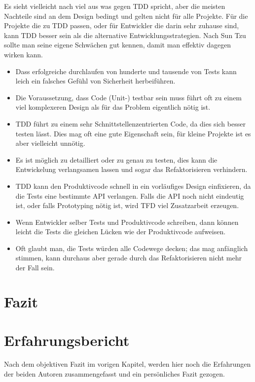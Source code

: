 \documentclass{mitschrift}
\newcommand{\pje}{\marginpar{Philipp\\Jeske}}
\begin{document}
Es sieht vielleicht nach viel aus was gegen TDD spricht, aber die meisten
Nachteile sind an dem Design bedingt und gelten nicht für alle Projekte. Für
die Projekte die zu TDD passen, oder für Entwickler die darin sehr zuhause
sind, kann TDD besser sein als die alternative Entwicklungsstrategien.
Nach Sun Tzu sollte man seine eigene Schwächen gut kennen, damit man effektiv
dagegen wirken kann.

\begin{itemize}
    \item Dass erfolgreiche durchlaufen von hunderte und tausende von Tests
        kann leich ein falsches Gefühl von Sicherheit herbeiführen.
        \cite{StackExchange}
    \item Die Voraussetzung, dass Code (Unit-) testbar sein muss führt oft zu
        einem viel komplexeren Design als für das Problem eigentlich nötig ist.
        \cite{StackExchange}
    \item TDD führt zu einem sehr Schnittstellenzentrierten Code, da dies sich
        besser testen lässt. Dies mag oft eine gute Eigenschaft sein, für
        kleine Projekte ist es aber vielleicht unnötig.
    \item Es ist möglich zu detailliert oder zu genau zu testen, dies kann die
        Entwickelung verlangsamen lassen und sogar das Refaktorisieren
        verhindern.
    \item TDD kann den Produktivcode schnell in ein vorläufiges Design
        einfixieren, da die Tests eine bestimmte API verlangen. Falls die API
        noch nicht eindeutig ist, oder falls Prototyping nötig ist, wird TFD
        viel Zusatzarbeit erzeugen. \cite{StackOverflow}
    \item Wenn Entwickler selber Tests und Produktivcode schreiben, dann können
        leicht die Tests die gleichen Lücken wie der Produktivcode aufweisen.
    \item Oft glaubt man, die Tests würden alle Codewege decken; das mag
        anfänglich stimmen, kann durchaus aber gerade durch das Refaktorisieren
        nicht mehr der Fall sein.
\end{itemize}

\chapter{Fazit}\label{Fazit}\pje

\chapter{Erfahrungsbericht}\label{Erfahrungsbericht}
Nach dem objektiven Fazit im vorigen Kapitel, werden hier noch die Erfahrungen
der beiden Autoren zusammengefasst und ein persönliches Fazit gezogen.
\end{document}
